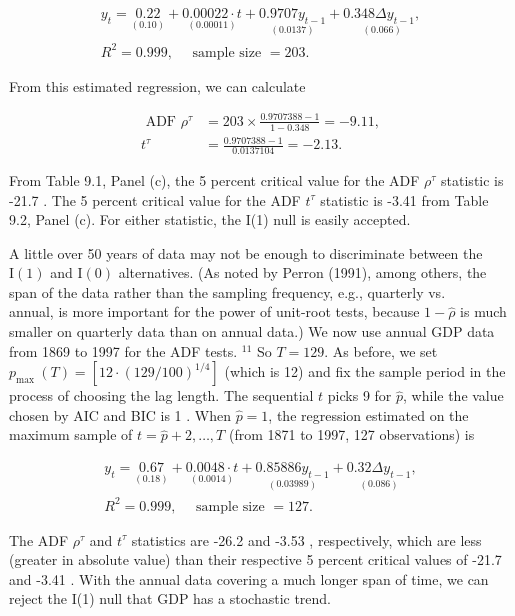 \documentclass[10pt]{article}
\begin{document}
$$
\begin{gathered}
y_{t}=\underset{(0.10)}{0.22}+\underset{(0.00011)}{0.00022 \cdot t}+\underset{(0.0137)}{0.9707 y_{t-1}}+\underset{(0.066)}{0.348 \Delta y_{t-1},} \\
R^{2}=0.999, \quad \text { sample size }=203 .
\end{gathered}
$$

From this estimated regression, we can calculate

$$
\begin{aligned}
\text { ADF } \rho^{\tau} & =203 \times \frac{0.9707388-1}{1-0.348}=-9.11, \\
t^{\tau} & =\frac{0.9707388-1}{0.0137104}=-2.13 .
\end{aligned}
$$

From Table 9.1, Panel (c), the 5 percent critical value for the ADF $\rho^{\tau}$ statistic is -21.7 . The 5 percent critical value for the ADF $t^{\tau}$ statistic is -3.41 from Table 9.2, Panel (c). For either statistic, the I(1) null is easily accepted.

A little over 50 years of data may not be enough to discriminate between the $\mathrm{I}(1)$ and $\mathrm{I}(0)$ alternatives. (As noted by Perron (1991), among others, the span of the data rather than the sampling frequency, e.g., quarterly vs.\\
annual, is more important for the power of unit-root tests, because $1-\hat{\rho}$ is much smaller on quarterly data than on annual data.) We now use annual GDP data from 1869 to 1997 for the ADF tests. ${ }^{11}$ So $T=129$. As before, we set $p_{\text {max }}(T)=\left[12 \cdot(129 / 100)^{1 / 4}\right]$ (which is 12) and fix the sample period in the process of choosing the lag length. The sequential $t$ picks 9 for $\hat{p}$, while the value chosen by AIC and BIC is 1 . When $\hat{p}=1$, the regression estimated on the maximum sample of $t=\hat{p}+2, \ldots, T$ (from 1871 to 1997, 127 observations) is

$$
\begin{gathered}
y_{t}=\underset{(0.18)}{0.67}+\underset{(0.0014)}{0.0048 \cdot t}+\underset{(0.03989)}{0.85886 y_{t-1}}+\underset{(0.086)}{0.32 \Delta y_{t-1}}, \\
R^{2}=0.999, \quad \text { sample size }=127 .
\end{gathered}
$$

The ADF $\rho^{\tau}$ and $t^{\tau}$ statistics are -26.2 and -3.53 , respectively, which are less (greater in absolute value) than their respective 5 percent critical values of -21.7 and -3.41 . With the annual data covering a much longer span of time, we can reject the I(1) null that GDP has a stochastic trend.
\end{document}
